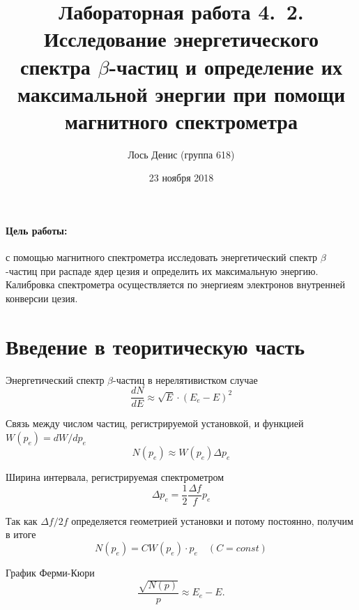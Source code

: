 \documentclass[12pt]{article}
\title{{\bf Лабораторная работа 4.\, 2. \\ Исследование энергетического спектра $\beta$-частиц и определение их максимальной энергии при помощи магнитного спектрометра}}
\author{Лось Денис (группа 618)}
\date{23 ноября 2018}
\begin{document}
\maketitle

\paragraph*{Цель работы: } с помощью магнитного спектрометра исследовать энергетический спектр $\beta$-частиц при распаде ядер цезия и определить их максимальную энергию. Калибровка спектрометра осуществляется по энергиеям электронов внутренней конверсии цезия.

\section*{Введение в теоритическую часть}
\par
	Энергетический спектр $\beta$-частиц в нерелятивистком случае
\[
	\frac{dN}{dE} \approx \sqrt{E} \cdot (E_e - E)^2
\]
\par
	Связь между числом частиц, регистрируемой установкой, и функцией $W(p_e) = dW / dp_e$
\[
	N(p_e) \approx W(p_e) \Delta p_e
\]
\par
	Ширина интервала, регистрируемая спектрометром
\[
	\Delta p_e = \frac{1}{2} \frac{\Delta f}{f} p_e
\]
\par
	Так как $\Delta f / 2f$ определяется геометрией установки и потому постоянно, получим в итоге
\[
	N(p_e) = CW(p_e) \cdot p_e \quad (C = const)
\]
\par
	График Ферми-Кюри
\[
	\frac{\sqrt{N(p)}}{p} \approx E_e - E.
\]
\end{document}
